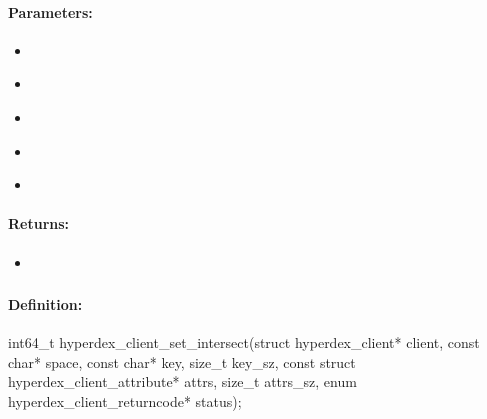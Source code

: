 \paragraph{Parameters:}
\begin{itemize}[noitemsep]
\item {}\\

\item {}\\

\item {}\\

\item {}\\

\item {}\\

\end{itemize}

\paragraph{Returns:}
\begin{itemize}[noitemsep]
\item {}\\

\end{itemize}

\pagebreak
\subsubsection{}
\label{api:c:set_intersect}


\paragraph{Definition:}
\begin{ccode}
int64_t hyperdex_client_set_intersect(struct hyperdex_client* client,
        const char* space,
        const char* key, size_t key_sz,
        const struct hyperdex_client_attribute* attrs, size_t attrs_sz,
        enum hyperdex_client_returncode* status);
\end{ccode}


